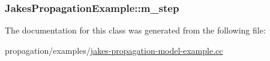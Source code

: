 \subsubsection[{\texorpdfstring{m\+\_\+step}{m_step}}]{ Jakes\+Propagation\+Example\+::m\+\_\+step\hspace{0.3cm}{\ttfamily [private]}}\hypertarget{classJakesPropagationExample_acd4432bfd3c7b99ece24e22a7c1cd5f9}{}\label{classJakesPropagationExample_acd4432bfd3c7b99ece24e22a7c1cd5f9}


The documentation for this class was generated from the following file\+:\begin{DoxyCompactItemize}
\item 
propagation/examples/\hyperlink{jakes-propagation-model-example_8cc}{jakes-\/propagation-\/model-\/example.\+cc}\end{DoxyCompactItemize}
